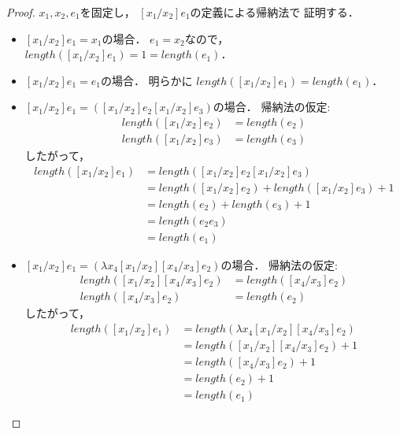 \documentclass{ltjsbook}%
\begin{document}
\begin{proof}%
  $\mathit{x}_1,\mathit{x}_2,\mathit{e}_1$を固定し，%
  $[\mathit{x}_1/\mathit{x}_2]\mathit{e}_1$の定義による帰納法で%
  証明する．%
  \begin{itemize}%
  \item $[\mathit{x}_1/\mathit{x}_2]\mathit{e}_1 = \mathit{x}_1$の場合．%
    $\mathit{e}_1 = \mathit{x}_2$なので，%
    $length([\mathit{x}_1/\mathit{x}_2]\mathit{e}_1)=1=length(\mathit{e}_1)$．%
  \item $[\mathit{x}_1/\mathit{x}_2]\mathit{e}_1 = \mathit{e}_1$の場合．%
    明らかに%
    $length([\mathit{x}_1/\mathit{x}_2]\mathit{e}_1)=length(\mathit{e}_1)$．%
  \item $[\mathit{x}_1/\mathit{x}_2]\mathit{e}_1%
    = ([\mathit{x}_1/\mathit{x}_2]\mathit{e}_2[\mathit{x}_1/\mathit{x}_2]\mathit{e}_3)$の場合．%
    帰納法の仮定:%
    \begin{align}%
    length([\mathit{x}_1/\mathit{x}_2]\mathit{e}_2)&=length(\mathit{e}_2)\\%
    length([\mathit{x}_1/\mathit{x}_2]\mathit{e}_3)&=length(\mathit{e}_3)%
    \end{align}%
    したがって，%
    \begin{align}%
    length([\mathit{x}_1/\mathit{x}_2]\mathit{e}_1)%
    &=length([\mathit{x}_1/\mathit{x}_2]\mathit{e}_2%
    [\mathit{x}_1/\mathit{x}_2]\mathit{e}_3)\\%
    &=length([\mathit{x}_1/\mathit{x}_2]\mathit{e}_2)%
    +length([\mathit{x}_1/\mathit{x}_2]\mathit{e}_3)+1\\%
    &=length(\mathit{e}_2)+length(\mathit{e}_3)+1\\%
    &=length(\mathit{e}_2\mathit{e}_3)\\%
    &=length(\mathit{e}_1)%
    \end{align}%
  \item $[\mathit{x}_1/\mathit{x}_2]\mathit{e}_1%
    = (\lambda\mathit{x}_4[\mathit{x}_1/\mathit{x}_2]%
    [\mathit{x}_4/\mathit{x}_3]\mathit{e}_2)$の場合．%
    帰納法の仮定:%
    \begin{align}%
      length([\mathit{x}_1/\mathit{x}_2][\mathit{x}_4/\mathit{x}_3]\mathit{e}_2)%
      &=length([\mathit{x}_4/\mathit{x}_3]\mathit{e}_2)\\%
      length([\mathit{x}_4/\mathit{x}_3]\mathit{e}_2)%
      &=length(\mathit{e}_2)%
    \end{align}%
    したがって，%
    \begin{align}%
    length([\mathit{x}_1/\mathit{x}_2]\mathit{e}_1)%
    &=length(\lambda\mathit{x}_4[\mathit{x}_1/\mathit{x}_2][\mathit{x}_4/\mathit{x}_3]\mathit{e}_2)\\%
    &=length([\mathit{x}_1/\mathit{x}_2][\mathit{x}_4/\mathit{x}_3]\mathit{e}_2)+1\\%
    &=length([\mathit{x}_4/\mathit{x}_3]\mathit{e}_2)+1\\%
    &=length(\mathit{e}_2)+1\\%
    &=length(\mathit{e}_1)%
    \end{align}%
  \end{itemize}%
\end{proof}%
\end{document}
